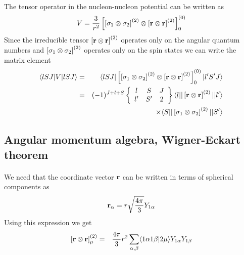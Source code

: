 \documentclass[%
twoside,                 %
final,                   %
10pt]{article}
\begin{document}
\paragraph{}
The tensor operator in 
the nucleon-nucleon potential can be written as  
\[
V=\frac{3}{r^{2}}\left[ \left[ {\bf \sigma}_1 \otimes {\bf \sigma}_2\right]^
{(2)} \otimes\left[{\bf r} \otimes {\bf r} \right]^{(2)}\right]^{(0)}_0
\]
Since the irreducible tensor  
$\left[{\bf r} \otimes {\bf r} \right]^{(2)}$
operates  only on the angular quantum numbers and
$\left[{\bf \sigma}_1 \otimes {\bf \sigma}_2\right]^{(2)}$ 
operates  only on 
the spin states we can write the matrix element 
\begin{eqnarray*}
\langle lSJ\vert V\vert lSJ\rangle & = &
\langle lSJ \vert\left[ \left[{\bf \sigma}_1 \otimes {\bf \sigma}_2\right]^{(2)} \otimes
\left[{\bf r} \otimes {\bf r} \right]^{(2)}\right]^{(0)}_0\vert l'S'J\rangle \\
&  = &
(-1)^{J+l+S}
\left\{\begin{array}{ccc} l&S&J \\ l'&S'&2\end{array}\right\}
\langle l \vert\vert\left[{\bf r} \otimes {\bf r} \right]^{(2)} \vert \vert l'\rangle\\
& &
\times \langle S\vert\vert\left[{\bf \sigma}_1 \otimes {\bf \sigma}_2\right]^{(2)} \vert\vert S'\rangle
\end{eqnarray*}



\subsection{Angular momentum algebra, Wigner-Eckart theorem}

\paragraph{}
We need that
the coordinate vector ${\bf r}$ can be written in terms of spherical 
components as 
\[
{\bf r}_\alpha = r\sqrt{\frac{4\pi}{3}} Y_{1\alpha}
\]
Using this expression we get 
\begin{eqnarray*}
\left[{\bf r} \otimes {\bf r} \right]^{(2)}_\mu &=& \frac{4\pi}{3}r^2
\sum_{\alpha ,\beta}\langle 1\alpha 1\beta\vert 2\mu \rangle Y_{1\alpha} Y_{1\beta}
\end{eqnarray*}
\end{document}
